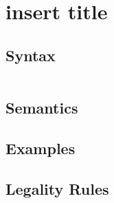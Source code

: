 \chapter{insert title}\label{cha::insert_title}

\section{Syntax}

\begin{lstlisting}[caption={insert caption}, label=lst::ARM:insert_caption:syntax, style=listing, language=ebnf, float=tpb]
% ENBF notation of the grammar syntax
\end{lstlisting}


\section{Semantics}

\section{Examples}

\section{Legality Rules}


\comments{}

\pending{}

\furtherreading{}